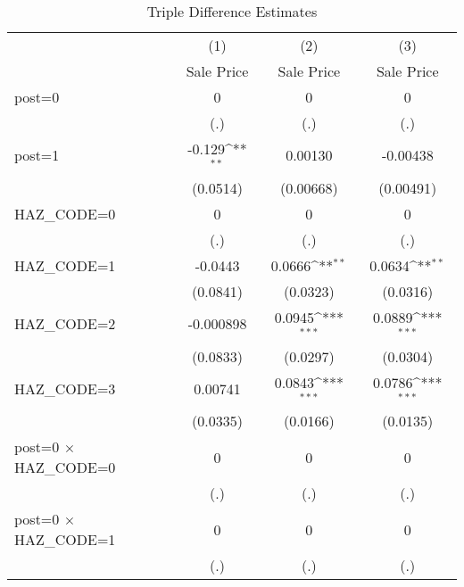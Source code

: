 \begin{table}[htbp]\centering
\def\sym#1{\ifmmode^{#1}\else\(^{#1}\)\fi}
\caption{Triple Difference Estimates\label{tabl}}
\begin{tabular}{l*{3}{c}}
\hline\hline
                    &\multicolumn{1}{c}{(1)}&\multicolumn{1}{c}{(2)}&\multicolumn{1}{c}{(3)}\\
                    &\multicolumn{1}{c}{Sale Price}&\multicolumn{1}{c}{Sale Price}&\multicolumn{1}{c}{Sale Price}\\
\hline
post=0              &           0         &           0         &           0         \\
                    &         (.)         &         (.)         &         (.)         \\
[1em]
post=1              &      -0.129\sym{**} &     0.00130         &    -0.00438         \\
                    &    (0.0514)         &   (0.00668)         &   (0.00491)         \\
[1em]
HAZ\_CODE=0          &           0         &           0         &           0         \\
                    &         (.)         &         (.)         &         (.)         \\
[1em]
HAZ\_CODE=1          &     -0.0443         &      0.0666\sym{**} &      0.0634\sym{**} \\
                    &    (0.0841)         &    (0.0323)         &    (0.0316)         \\
[1em]
HAZ\_CODE=2          &   -0.000898         &      0.0945\sym{***}&      0.0889\sym{***}\\
                    &    (0.0833)         &    (0.0297)         &    (0.0304)         \\
[1em]
HAZ\_CODE=3          &     0.00741         &      0.0843\sym{***}&      0.0786\sym{***}\\
                    &    (0.0335)         &    (0.0166)         &    (0.0135)         \\
[1em]
post=0 $\times$ HAZ\_CODE=0&           0         &           0         &           0         \\
                    &         (.)         &         (.)         &         (.)         \\
[1em]
post=0 $\times$ HAZ\_CODE=1&           0         &           0         &           0         \\
                    &         (.)         &         (.)         &         (.)         \\

\end{tabular}
\end{table}
